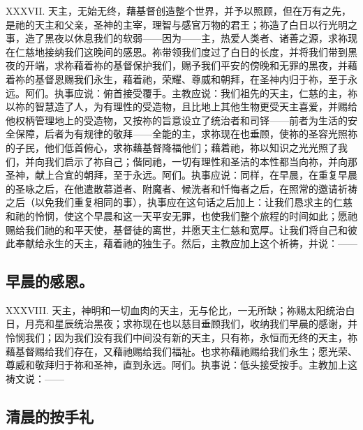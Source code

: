 XXXVII. 天主，无始无终，藉基督创造整个世界，并予以照顾，但在万有之先，是祂的天主和父亲，圣神的主宰，理智与感官万物的君王；祢造了白日以行光明之事，造了黑夜以休息我们的软弱——因为——主，热爱人类者、诸善之源，求祢现在仁慈地接纳我们这晚间的感恩。祢带领我们度过了白日的长度，并将我们带到黑夜的开端，求祢藉着祢的基督保护我们，赐予我们平安的傍晚和无罪的黑夜，并藉着祢的基督恩赐我们永生，藉着祂，荣耀、尊威和朝拜，在圣神内归于祢，至于永远。阿们。执事应说：俯首接受覆手。主教应说：我们祖先的天主，仁慈的主，祢以祢的智慧造了人，为有理性的受造物，且比地上其他生物更受天主喜爱，并赐给他权柄管理地上的受造物，又按祢的旨意设立了统治者和司铎——前者为生活的安全保障，后者为有规律的敬拜——全能的主，求祢现在也垂顾，使祢的圣容光照祢的子民，他们低首俯心，求祢藉基督降福他们；藉着祂，祢以知识之光光照了我们，并向我们启示了祢自己；偕同祂，一切有理性和圣洁的本性都当向祢，并向那圣神，献上合宜的朝拜，至于永远。阿们。执事应说：同样，在早晨，在重复早晨的圣咏之后，在他遣散慕道者、附魔者、候洗者和忏悔者之后，在照常的邀请祈祷之后（以免我们重复相同的事），执事应在这句话之后加上：让我们恳求主的仁慈和祂的怜悯，使这个早晨和这一天平安无罪，也使我们整个旅程的时间如此；愿祂赐给我们祂的和平天使，基督徒的离世，并愿天主仁慈和宽厚。让我们将自己和彼此奉献给永生的天主，藉着祂的独生子。然后，主教应加上这个祈祷，并说：——\par


\subsection{早晨的感恩。}

XXXVIII. 天主，神明和一切血肉的天主，无与伦比，一无所缺；祢赐太阳统治白日，月亮和星辰统治黑夜；求祢现在也以慈目垂顾我们，收纳我们早晨的感谢，并怜悯我们；因为我们没有我们中间没有新的天主，只有祢，永恒而无终的天主，祢藉基督赐给我们存在，又藉祂赐给我们福祉。也求祢藉祂赐给我们永生；愿光荣、尊威和敬拜归于祢和圣神，直到永远。阿们。执事说：低头接受按手。主教加上这祷文说：——\par


\subsection{清晨的按手礼}

